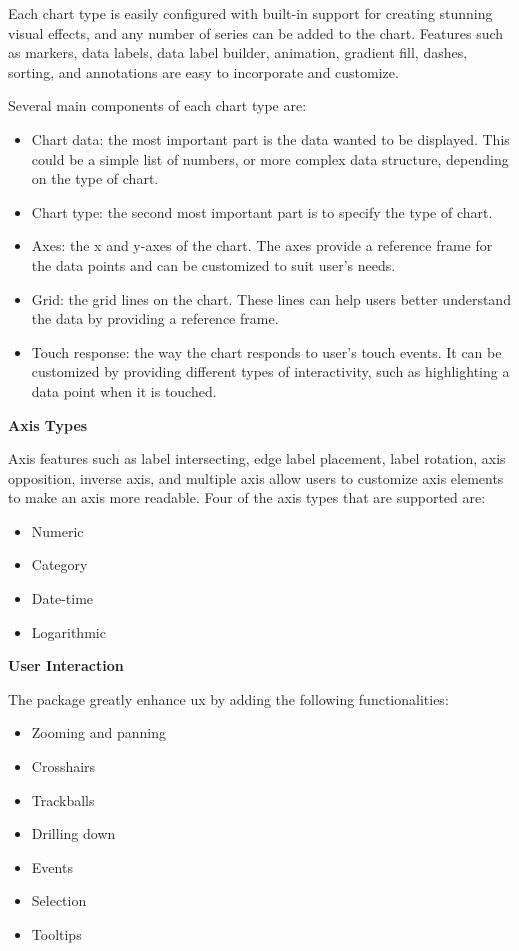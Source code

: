 \begin{multicols}{2}
      Each chart type is easily configured with built-in support for creating stunning visual effects, and any
      number of series can be added to the chart. Features such as markers, data labels, data label builder,
      animation, gradient fill, dashes, sorting, and annotations are easy to incorporate and customize.

      Several main components of each chart type are:
      \begin{itemize}
            \item Chart data: the most important part is the data wanted to be displayed. This could be a simple
                  list of numbers, or more complex data structure, depending on the type of chart.
            \item Chart type: the second most important part is to specify the type of chart.
            \item Axes: the x and y-axes of the chart. The axes provide a reference frame for the data points and
                  can be customized to suit user's needs.
            \item Grid: the grid lines on the chart. These lines can help users better understand the data by
                  providing a reference frame.
            \item Touch response: the way the chart responds to user's touch events. It can be customized by
                  providing different types of interactivity, such as highlighting a data point when it is touched.
      \end{itemize}

      \textbf{Axis Types}

      Axis features such as label intersecting, edge label placement, label rotation, axis opposition, inverse
      axis, and multiple axis allow users to customize axis elements to make an axis more readable. Four of the
      axis types that are supported are:
      \begin{itemize}
            \item Numeric
            \item Category
            \item Date-time
            \item Logarithmic
      \end{itemize}

      \textbf{User Interaction}

      The package greatly enhance \acrshort{ux} by adding the following functionalities:
      \begin{itemize}
            \item Zooming and panning
            \item Crosshairs
            \item Trackballs
            \item Drilling down
            \item Events
            \item Selection
            \item Tooltips
      \end{itemize}


\end{multicols}
